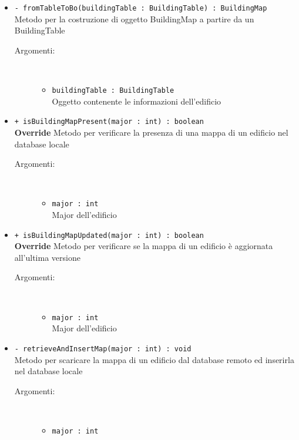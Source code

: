 \documentclass[../DefinizioneDiProdotto.tex]{subfiles}
\begin{document}
\begin{description}
\begin{itemize}
\begin{description}
\end{description}
\item \texttt{- fromTableToBo(buildingTable : BuildingTable) : BuildingMap}\\
Metodo per la costruzione di oggetto BuildingMap a partire da un BuildingTable
 \begin{description}
\item[Argomenti:] \
\begin{itemize}
\item \texttt{buildingTable : BuildingTable}\\
Oggetto contenente le informazioni dell'edificio\end{itemize}
\end{description}
\item \texttt{+ isBuildingMapPresent(major : int) : boolean}\\
\textbf{Override} Metodo per verificare la presenza di una mappa di un edificio nel database locale
 \begin{description}
\item[Argomenti:] \
\begin{itemize}
\item \texttt{major : int}\\
Major dell'edificio\end{itemize}
\end{description}
\item \texttt{+ isBuildingMapUpdated(major : int) : boolean}\\
\textbf{Override} Metodo per verificare se la mappa di un edificio è aggiornata all'ultima versione
 \begin{description}
\item[Argomenti:] \
\begin{itemize}
\item \texttt{major : int}\\
Major dell'edificio\end{itemize}
\end{description}
\item \texttt{- retrieveAndInsertMap(major : int) : void}\\
Metodo per scaricare la mappa di un edificio dal database remoto ed inserirla nel database locale
 \begin{description}
\item[Argomenti:] \
\begin{itemize}
\item \texttt{major : int}\\

\end{itemize}
\end{description}
\end{itemize}
\end{description}
\end{document}
